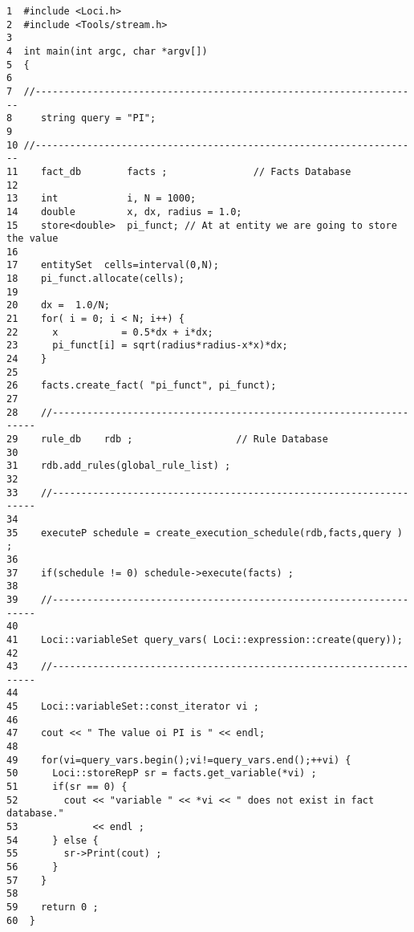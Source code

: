 \begin{verbatim}
1  #include <Loci.h>
2  #include <Tools/stream.h>
3
4  int main(int argc, char *argv[])
5  {
6
7  //-------------------------------------------------------------------
8     string query = "PI";
9
10 //-------------------------------------------------------------------
11    fact_db        facts ;               // Facts Database
12
13    int            i, N = 1000;
14    double         x, dx, radius = 1.0;
15    store<double>  pi_funct; // At at entity we are going to store the value
16
17    entitySet  cells=interval(0,N);
18    pi_funct.allocate(cells);
19
20    dx =  1.0/N;
21    for( i = 0; i < N; i++) {
22      x           = 0.5*dx + i*dx;
23      pi_funct[i] = sqrt(radius*radius-x*x)*dx;
24    }
25
26    facts.create_fact( "pi_funct", pi_funct);
27
28    //-------------------------------------------------------------------
29    rule_db    rdb ;                  // Rule Database
30
31    rdb.add_rules(global_rule_list) ;
32
33    //-------------------------------------------------------------------
34
35    executeP schedule = create_execution_schedule(rdb,facts,query ) ;
36
37    if(schedule != 0) schedule->execute(facts) ;
38
39    //-------------------------------------------------------------------
40
41    Loci::variableSet query_vars( Loci::expression::create(query));
42
43    //-------------------------------------------------------------------
44
45    Loci::variableSet::const_iterator vi ;
46
47    cout << " The value oi PI is " << endl;
48
49    for(vi=query_vars.begin();vi!=query_vars.end();++vi) {
50      Loci::storeRepP sr = facts.get_variable(*vi) ;
51      if(sr == 0) {
52        cout << "variable " << *vi << " does not exist in fact database."
53             << endl ;
54      } else {
55        sr->Print(cout) ;
56      }
57    }
58
59    return 0 ;
60  }
\end{verbatim}

%
